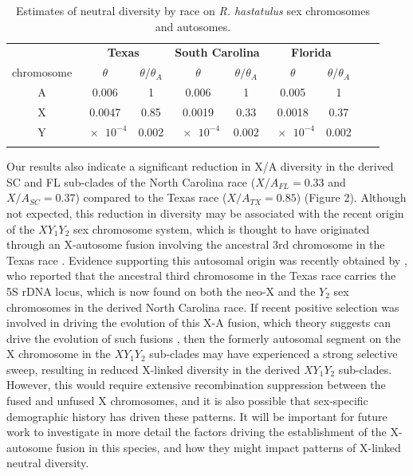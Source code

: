 \documentclass[9pt,twocolumn,twoside]{gsajnl}
\begin{document}
\begin{table}[t!]
\centering
\caption{Estimates of neutral diversity by race on \textit{R. hastatulus} sex chromosomes and autosomes.}
\begin{tabular}{ccccccccc}
\textbf{} & \multicolumn{2}{c}{\textbf{Texas}} & \multicolumn{2}{c}{\textbf{South Carolina}} & \multicolumn{2}{c}{\textbf{Florida}} \\
chromosome & $\theta$ & $\theta/\theta_{A}$ & $\theta$ & $\theta/\theta_{A}$ & $\theta$ & $\theta/\theta_{A}$ \\
\midrule
A & 0.006 & 1 & 0.006 & 1 & 0.005 & 1 \\
X & 0.0047 & 0.85 & 0.0019 & 0.33 & 0.0018 & 0.37 \\
Y & $\num{e-4}$ & 0.002 & $\num{e-4}$ & 0.002 & $\num{e-4}$ & 0.002 \\
\addlinespace

\bottomrule
\end{tabular}
\end{table}


Our results also indicate a significant reduction in X/A diversity in the derived SC and FL sub-clades of the North Carolina race ($X/A_{FL}=0.33$ and $X/A_{SC}=0.37$) compared to the Texas race ($X/A_{TX}=0.85$) (Figure 2). Although not expected, this reduction in diversity may be associated with the recent origin of the $XY_{1}Y_{2}$ sex chromosome system, which is thought to have originated through an X-autosome fusion involving the ancestral 3rd chromosome in the Texas race \citep{smith1964evolving}. Evidence supporting this autosomal origin was recently obtained by \citep{grabowska2015}, who reported that the ancestral third chromosome in the Texas race carries the 5S rDNA locus, which is now found on both the neo-X and the $Y_{2}$ sex chromosomes in the derived North Carolina race. If recent positive selection was involved in driving the evolution of this X-A fusion, which theory suggests can drive the evolution of such fusions \citep{charlesworth1980sex}, then the formerly autosomal segment on the X chromosome in the $XY_{1}Y_{2}$ sub-clades may have experienced a strong selective sweep, resulting in reduced X-linked diversity in the derived $XY_{1}Y_{2}$ sub-clades. However, this would require extensive recombination suppression between the fused and unfused X chromosomes, and it is also possible that sex-specific demographic history has driven these patterns. It will be important for future work to investigate in more detail the factors driving the establishment of the X-autosome fusion in this species, and how they might impact patterns of X-linked neutral diversity.
\end{document}
